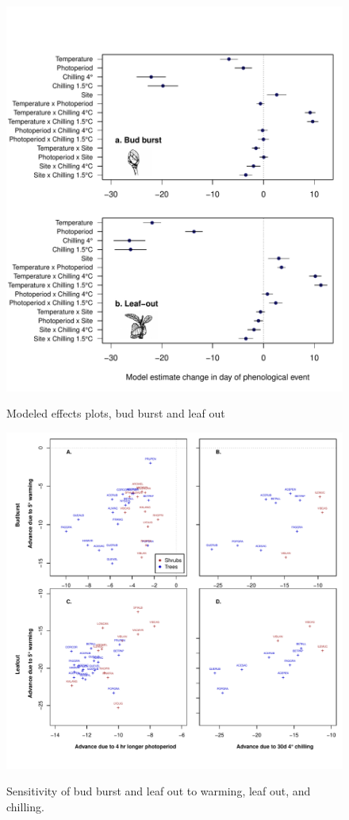 \documentclass[11pt]{article}
\begin{document}

\begin{figure}
\begin{center}
\caption{Modeled effects plots, bud burst and leaf out}
\includegraphics[scale=0.8]{Fig1_bb_lo}
\label{fig2}
\end{center}
\end{figure}


\begin{figure}
\caption{Sensitivity of bud burst and leaf out to warming, leaf out, and chilling.}
\includegraphics[scale=0.9]{Fig2_4panel}
\label{fig3}
\end{figure}
\end{document}
